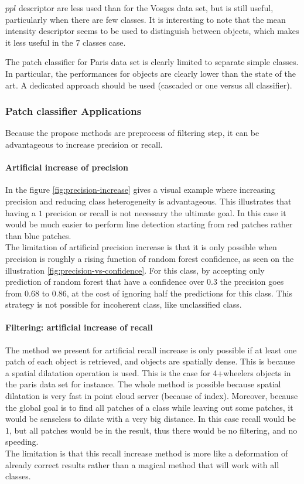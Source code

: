 				 $ppl$ descriptor are less used than for the Vosges data set, but is still useful, particularly when there are few classes.
				 It is interesting to note that the mean intensity descriptor seems to be used to distinguish between objects, which makes it less useful in the 7 classes case.
				 
				 The patch classifier for Paris data set is clearly limited to separate simple classes. In particular, the performances for objects are clearly lower than the state of the art. A dedicated approach should be used (cascaded or one versus all classifier). 
				 
		 \subsubsection{Patch classifier Applications}
			 Because the propose methods are preprocess of filtering step, it can be advantageous to increase precision or recall.
			 \paragraph{Artificial increase of precision}
				 In the figure \ref{fig:precision-increase} gives a visual example where increasing precision and reducing class heterogeneity is advantageous. This illustrates that having a $1$ precision or recall is not necessary the ultimate goal.
				 In this case it would be much easier to perform line detection starting from red patches rather than blue patches.
				 \\
				 The limitation of artificial precision increase is 
				 that it is only possible when precision is roughly a rising function of random forest confidence, as seen on the illustration \ref{fig:precision-vs-confidence}.
				 For this class, by accepting only prediction of random forest that have a confidence over $0.3$ the precision goes from $0.68$ to $0.86$, at the cost of ignoring half the predictions for this class.
				 This strategy is not possible for incoherent class, like unclassified class.
				 
				 
			\paragraph{Filtering: artificial increase of recall}
				The method we present for artificial recall increase is only possible if at least one patch of each object is retrieved, and objects are spatially dense.
				This is because a spatial dilatation operation is used.
				This is the case for 4+wheelers objects in the paris data set for instance.
				The whole method is possible because spatial dilatation is very fast in point cloud server (because of index).
				Moreover, because the global goal is to find all patches of a class while leaving out some patches, it would be senseless to dilate with a very big distance. In this case recall would be $1$, but all patches would be in the result, thus there would be no filtering, and no speeding.
				\\
				The limitation is that this recall increase method is more like a deformation of already correct results rather than a magical method that will work with all classes.
				